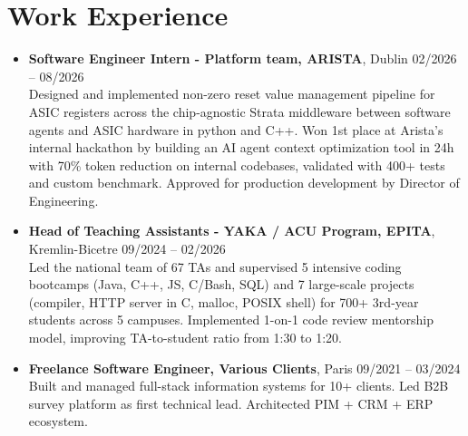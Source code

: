 \documentclass[9pt,a4paper]{article}
\begin{document}
\section*{Work Experience}
\begin{tcolorbox}[mybox]
\begin{itemize}
\item\textbf{Software Engineer Intern - Platform team, ARISTA}, Dublin \hfill {\small02/2026 – 08/2026}\\[0.5em]
\textcolor{gray!40!black}{Designed and implemented non-zero reset value management pipeline for ASIC registers across the chip-agnostic Strata middleware between software agents and ASIC hardware in python and C++. Won 1st place at Arista’s internal hackathon by building an AI agent context optimization tool in 24h with 70\% token reduction on internal codebases, validated with 400+ tests and custom benchmark.
Approved for production development by Director of Engineering.}

\item\textbf{Head of Teaching Assistants - YAKA / ACU Program, EPITA}, Kremlin-Bicetre \hfill {\small09/2024 – 02/2026}\\[0.5em]
\textcolor{gray!40!black}{Led the national team of 67 TAs and supervised 5 intensive coding bootcamps (Java, C++, JS, C/Bash, SQL) and 7 large-scale projects (compiler, HTTP server in C, malloc, POSIX shell) for 700+ 3rd-year students across 5 campuses. Implemented 1-on-1 code review mentorship model, improving TA-to-student ratio from 1:30 to 1:20.}

\item\textbf{Freelance Software Engineer, Various Clients}, Paris \hfill {\small09/2021 – 03/2024}\\[0.5em]
\textcolor{gray!40!black}{Built and managed full-stack information systems for 10+ clients. Led B2B survey platform as first technical lead. Architected PIM + CRM + ERP ecosystem.}
\end{itemize}
\end{tcolorbox}
\end{document}
